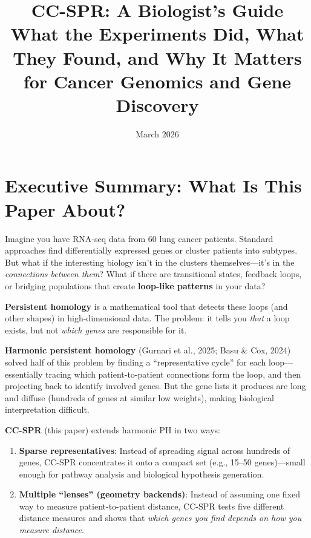 \documentclass[11pt]{article}
\title{\textbf{CC-SPR: A Biologist's Guide}\\[8pt]
\large What the Experiments Did, What They Found, and Why It Matters\\for Cancer Genomics and Gene Discovery}
\author{}
\date{March 2026}
\begin{document}
\maketitle

\tableofcontents
\newpage

\section{Executive Summary: What Is This Paper About?}

Imagine you have RNA-seq data from 60 lung cancer patients. Standard approaches find differentially expressed genes or cluster patients into subtypes. But what if the interesting biology isn't in the clusters themselves---it's in the \emph{connections between them}? What if there are transitional states, feedback loops, or bridging populations that create \textbf{loop-like patterns} in your data?

\textbf{Persistent homology} is a mathematical tool that detects these loops (and other shapes) in high-dimensional data. The problem: it tells you \emph{that} a loop exists, but not \emph{which genes} are responsible for it.

\textbf{Harmonic persistent homology} (Gurnari et al., 2025; Basu \& Cox, 2024) solved half of this problem by finding a ``representative cycle'' for each loop---essentially tracing which patient-to-patient connections form the loop, and then projecting back to identify involved genes. But the gene lists it produces are long and diffuse (hundreds of genes at similar low weights), making biological interpretation difficult.

\textbf{CC-SPR} (this paper) extends harmonic PH in two ways:
\begin{enumerate}
    \item \textbf{Sparse representatives}: Instead of spreading signal across hundreds of genes, CC-SPR concentrates it onto a compact set (e.g., 15--50 genes)---small enough for pathway analysis and biological hypothesis generation.
    \item \textbf{Multiple ``lenses'' (geometry backends)}: Instead of assuming one fixed way to measure patient-to-patient distance, CC-SPR tests five different distance measures and shows that \emph{which genes you find depends on how you measure distance}.
\end{enumerate}
\end{document}
